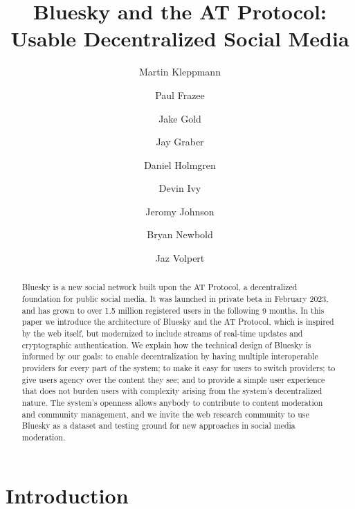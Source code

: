 \documentclass[sigconf,nonacm]{acmart}
\begin{document}
\title{Bluesky and the AT Protocol: Usable Decentralized Social Media}
\author{Martin Kleppmann}

\author{Paul Frazee} %
\author{Jake Gold} %
\author{Jay Graber} %
\author{Daniel Holmgren} %
\author{Devin Ivy} %
\author{Jeromy Johnson} %
\author{Bryan Newbold} %
\author{Jaz Volpert} %

\begin{abstract}
    Bluesky is a new social network built upon the AT Protocol, a decentralized foundation for public social media.
    It was launched in private beta in February 2023, and has grown to over 1.5 million registered users in the following 9 months.
    In this paper we introduce the architecture of Bluesky and the AT Protocol, which is inspired by the web itself, but modernized to include streams of real-time updates and cryptographic authentication.
    We explain how the technical design of Bluesky is informed by our goals: to enable decentralization by having multiple interoperable providers for every part of the system; to make it easy for users to switch providers; to give users agency over the content they see; and to provide a simple user experience that does not burden users with complexity arising from the system's decentralized nature.
    The system's openness allows anybody to contribute to content moderation and community management, and we invite the web research community to use Bluesky as a dataset and testing ground for new approaches in social media moderation.
\end{abstract}

\maketitle
\pagestyle{plain} %

\section{Introduction}\label{sec:introduction}
\end{document}
